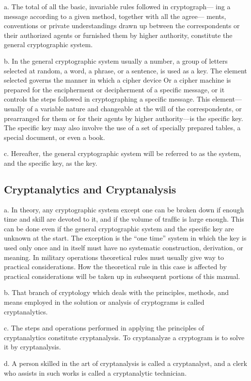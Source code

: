 a. The total of all the basic, invariable rules followed in cryptograph—
ing a message according to a given method, together with all the agree—
ments, conventions or private understandings drawn up between the
correspondents or their authorized agents or furnished them by higher
authority, constitute the general cryptographic system.

b. In the general cryptographic system usually a number, a group of
letters selected at random, a word, a phrase, or a sentence, is used as a
key. The element selected governs the manner in which a cipher device
Or a cipher machine is prepared for the encipherment or decipherment
of a speciﬁc message, or it controls the steps followed in cryptographing
a specific message. This element—usually of a variable nature and
changeable at the will of the correspondents, or prearranged for them or
for their agents by higher authority—is the speciﬁc key. The speciﬁc key
may also involve the use of a set of specially prepared tables, a special
document, or even a book.

c. Hereafter, the general cryptographic system will be referred to as
the system, and the speciﬁc key, as the key.

\subsection{Cryptanalytics and Cryptanalysis}

a. In theory, any cryptographic system except one can be broken down
if enough time and skill are devoted to it, and if the volume of trafﬁc is
large enough. This can be done even if the general cryptographic system
and the speciﬁc key are unknown at the start. The exception is the “one
time” system in which the key is used only once and in itself must have
no systematic construction, derivation, or meaning. In military operations
theoretical rules must usually give way to practical considerations. How
the theoretical rule in this case is affected by practical considerations
will be taken up in subsequent portions of this manual.

b. That branch of cryptology which deals with the principles, methods,
and means employed in the solution or analysis of cryptograms is called
cryptanalytics.

c. The steps and operations performed in applying the principles of
cryptanalytics constitute cryptanalysis. To cryptanalyze a cryptogram is
to solve it by cryptanalysis.

d. A person skilled in the art of cryptanalysis is called a cryptanalyst,
and a clerk who assists in such works is called a cryptanalytic technician.

